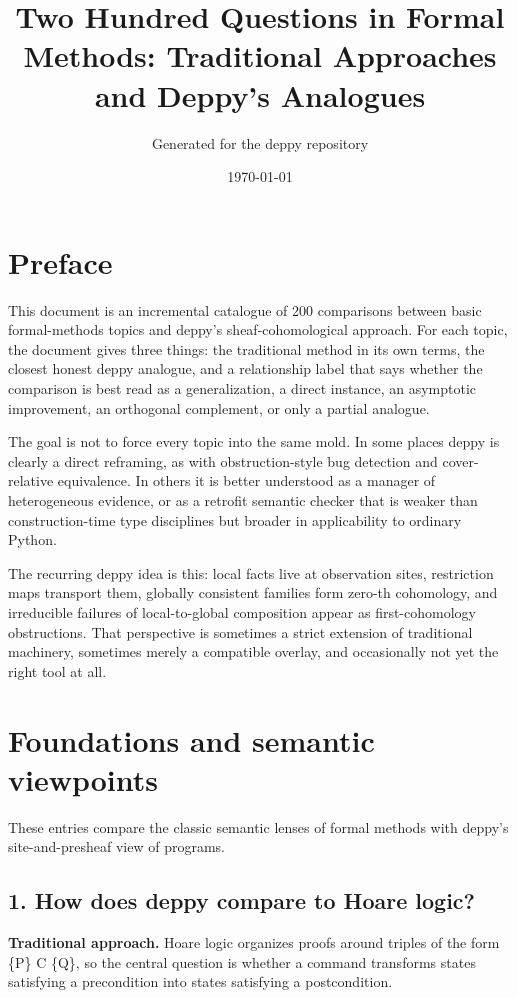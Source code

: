 \documentclass[11pt,openany]{book}
\begin{document}
\title{Two Hundred Questions in Formal Methods: Traditional Approaches and Deppy's Analogues}
\author{Generated for the deppy repository}
\date{\today}
\maketitle
\tableofcontents
\chapter*{Preface}
This document is an incremental catalogue of 200 comparisons between basic formal-methods topics and deppy's sheaf-cohomological approach.
For each topic, the document gives three things: the traditional method in its own terms, the closest honest deppy analogue, and a relationship label that says whether the comparison is best read as a generalization, a direct instance, an asymptotic improvement, an orthogonal complement, or only a partial analogue.

The goal is not to force every topic into the same mold. In some places deppy is clearly a direct reframing, as with obstruction-style bug detection and cover-relative equivalence. In others it is better understood as a manager of heterogeneous evidence, or as a retrofit semantic checker that is weaker than construction-time type disciplines but broader in applicability to ordinary Python.

The recurring deppy idea is this: local facts live at observation sites, restriction maps transport them, globally consistent families form zero-th cohomology, and irreducible failures of local-to-global composition appear as first-cohomology obstructions. That perspective is sometimes a strict extension of traditional machinery, sometimes merely a compatible overlay, and occasionally not yet the right tool at all.

\chapter{Foundations and semantic viewpoints}
These entries compare the classic semantic lenses of formal methods with deppy's site-and-presheaf view of programs.

\section*{1. How does deppy compare to Hoare logic?}
\textbf{Traditional approach.} Hoare logic organizes proofs around triples of the form \{P\} C \{Q\}, so the central question is whether a command transforms states satisfying a precondition into states satisfying a postcondition.
\end{document}
